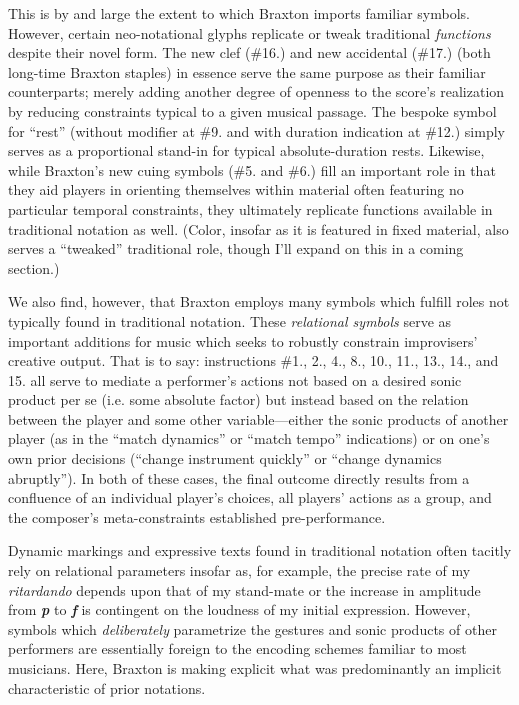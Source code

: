        This is by and large the extent to which Braxton imports familiar symbols. However, certain neo-notational glyphs replicate or tweak traditional \textit{functions} despite their novel form. The new clef (\#16.) and new accidental (\#17.) (both long-time Braxton staples) in essence serve the same purpose as their familiar counterparts; merely adding another degree of openness to the score's realization by reducing constraints typical to a given musical passage. The bespoke symbol for ``rest'' (without modifier at \#9. and with duration indication at \#12.) simply serves as a proportional stand-in for typical absolute-duration rests. Likewise, while Braxton's new cuing symbols (\#5. and \#6.) fill an important role in that they aid players in orienting themselves within material often featuring no particular temporal constraints, they ultimately replicate functions available in traditional notation as well. (Color, insofar as it is featured in fixed material, also serves a ``tweaked'' traditional role, though I'll expand on this in a coming section.)
       
       We also find, however, that Braxton employs many symbols which fulfill roles not typically found in traditional notation. These \textit{relational symbols} serve as important additions for music which seeks to robustly constrain improvisers' creative output. That is to say: instructions \#1., 2., 4., 8., 10., 11., 13., 14., and 15. all serve to mediate a performer's actions not based on a desired sonic product per se (i.e. some absolute factor) but instead based on the relation between the player and some other variable---either the sonic products of another player (as in the ``match dynamics'' or ``match tempo'' indications) or on one's own prior decisions (``change instrument quickly'' or ``change dynamics abruptly''). In both of these cases, the final outcome directly results from a confluence of an individual player's choices, all players' actions as a group, and the composer's meta-constraints established pre-performance.
    
       Dynamic markings and expressive texts found in traditional notation often tacitly rely on relational parameters insofar as, for example, the precise rate of my \textit{ritardando} depends upon that of my stand-mate or the increase in amplitude from \textbf{\textit{p}} to \textbf{\textit{f}} is contingent on the loudness of my initial expression. However, symbols which \textit{deliberately} parametrize the gestures and sonic products of other performers are essentially foreign to the encoding schemes familiar to most musicians. Here, Braxton is making explicit what was predominantly an implicit characteristic of prior notations.
    
